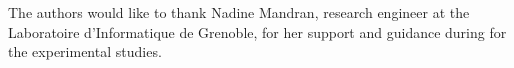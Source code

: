 

\begin{acknowledgements}
The authors would like to thank Nadine Mandran, research engineer at the Laboratoire d'Informatique de Grenoble, for her support and guidance during for the experimental studies.
\end{acknowledgements}


%
%








